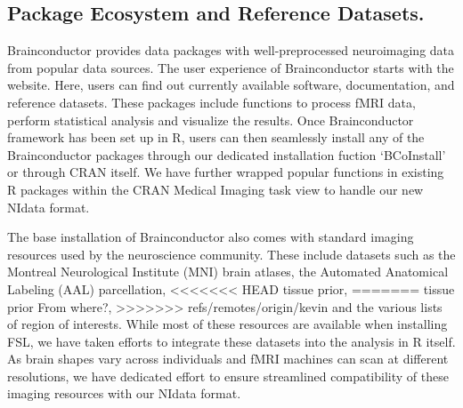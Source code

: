 \documentclass{nature}
\begin{document}
\subsection{Package Ecosystem and Reference Datasets.}
Brainconductor provides data packages with well-preprocessed neuroimaging data
from popular data sources.
The user experience of Brainconductor starts with the website. Here, users can
find out currently available software, documentation, and reference datasets.
These packages include functions to process fMRI data, perform statistical
analysis and visualize the results.
Once Brainconductor framework has been set up in R, users can then
seamlessly install any of the Brainconductor packages through our
dedicated installation fuction `BCoInstall' or through CRAN itself.
We have further wrapped popular functions in existing R packages
within the CRAN Medical Imaging task view to handle our new NIdata format.


The base installation of Brainconductor also comes with standard imaging
resources
used by the neuroscience community. These include datasets such
as the Montreal Neurological
Institute (MNI) brain atlases, the Automated Anatomical Labeling (AAL)
parcellation\cite{tzourio2002automated},
<<<<<<< HEAD
tissue prior,
=======
tissue prior {\color{red}From where?},
>>>>>>> refs/remotes/origin/kevin
and the various lists of region of interests. While most of these
resources are available when installing FSL, we have taken
efforts to integrate these datasets into the analysis in R itself.
As brain shapes vary across individuals
and fMRI machines can scan at different resolutions, we have
dedicated effort
to ensure streamlined compatibility of these imaging resources with our NIdata
format.
\end{document}
